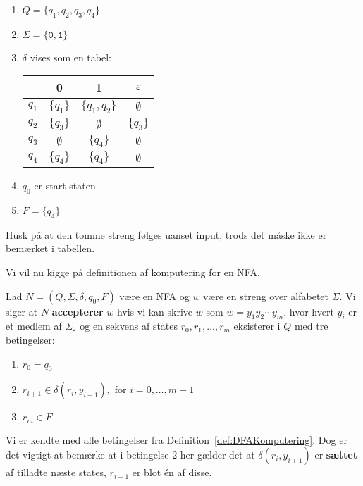 \begin{enumerate}
	\item $Q = \{q_{1}, q_{2}, q_{3}, q_4\}$
	\item $\Sigma = \{\mathtt{0,1}\}$
	\item $\delta$ vises som en tabel:\\
	      \begin{center}

		      \begin{tabular}{c|ccc}
			            & 0           & 1              & $\varepsilon$ \\ \hline
			      $q_1$ & $\{q_1\}$   & $\{q_1, q_2\}$ & $\emptyset$   \\
			      $q_2$ & $\{q_3\}$   & $\emptyset$    & $\{q_3\}$     \\
			      $q_3$ & $\emptyset$ & $\{q_4\}$      & $\emptyset$   \\
			      $q_4$ & $\{q_4\}$   & $\{q_4\}$      & $\emptyset$   \\
		      \end{tabular}
	      \end{center}
	\item $q_{0}$ er start staten
	\item $F = \{q_{4}\}$
\end{enumerate}

Husk på at den tomme streng følges uanset input, trods det måske ikke er bemærket i tabellen.

Vi vil nu kigge på definitionen af komputering for en NFA.

\begin{definition}
	\label{def:NFAKomputering}
	Lad $N = (Q, \Sigma, \delta, q_{0}, F)$ være en NFA og $w$ være en streng over alfabetet $\Sigma$. Vi siger at $N$ \textbf{accepterer} $w$ hvis vi kan skrive $w$ som $w = y_{1}y_{2} \cdots y_{m}$, hvor hvert $y_{i}$ er et medlem af $\Sigma_{\varepsilon}$ og en sekvens af states $r_{0}, r_{1}, \ldots, r_{m}$ eksisterer i $Q$ med tre betingelser:
	\begin{enumerate}
		\item $r_{0} = q_{0}$
		\item $r_{i+1} \in \delta(r_{i}, y_{i+1}), \text{ for } i = 0, \ldots, m - 1$
		\item $r_{m} \in F$
	\end{enumerate}
\end{definition}
Vi er kendte med alle betingelser fra Definition~\ref{def:DFAKomputering}. Dog er det vigtigt at bemærke at i betingelse 2 her gælder det at $\delta(r_{i}, y_{i+1})$ er \textbf{sættet} af tilladte næste states, $r_{i+1}$ er blot én af disse.

